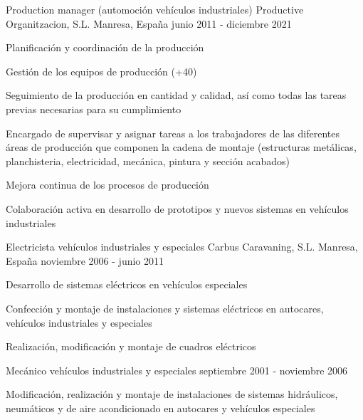 \begin{cventries}
  \cventry
    {Production manager (automoción vehículos industriales)} %
    {Productive Organitzacion, S.L.} %
    {Manresa, España} %
    {junio 2011 - diciembre 2021} %
    {
      \begin{cvitems} %
        \item {Planificación y coordinación de la producción}
        \item {Gestión de los equipos de producción (+40)}
        \item {Seguimiento de la producción en cantidad y calidad, así como todas las tareas previas necesarias para su cumplimiento}
        \item {Encargado de supervisar y asignar tareas a los trabajadores de las diferentes áreas de producción que componen la cadena de montaje (estructuras metálicas, planchisteria, electricidad, mecánica, pintura y sección acabados)}
        \item {Mejora continua de los procesos de producción}
        \item {Colaboración activa en desarrollo de prototipos y nuevos sistemas en vehículos industriales}
      \end{cvitems}
    }

  \cventry
    {Electricista vehículos industriales y especiales} %
    {Carbus Caravaning, S.L.} %
    {Manresa, España} %
    {noviembre 2006 - junio 2011} %
    {
      \begin{cvitems} %
        \item {Desarrollo de sistemas eléctricos en vehículos especiales}
        \item {Confección y montaje de instalaciones y sistemas eléctricos en autocares, vehículos industriales y especiales}
        \item {Realización, modificación y montaje de cuadros eléctricos}
      \end{cvitems}
    }

  \cventry
    {Mecánico vehículos industriales y especiales} %
    {} %
    {} %
    {septiembre 2001 - noviembre 2006} %
    {
      \begin{cvitems} %
        \item {Modificación, realización y montaje de instalaciones de sistemas hidráulicos, neumáticos y de aire acondicionado en autocares y vehículos especiales}
      \end{cvitems}
    }


\end{cventries}
